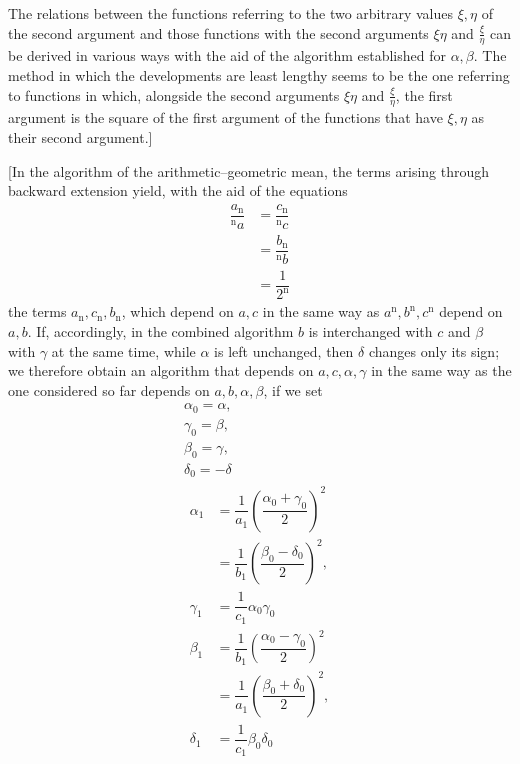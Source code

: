 The relations between the functions referring to the two arbitrary values $\xi,\allowbreak \eta$ of the second argument and those functions with the second arguments $\xi\eta$ and $\frac\xi\eta$ can be derived in various ways with
the aid of the algorithm established for $\alpha,\allowbreak \beta$. The method in which the developments are least lengthy seems to be the one referring to functions in which, alongside the second arguments $\xi\eta$ and $\frac{\xi}{\eta}$, the first argument is the square of the first argument of the functions that have $\xi,\allowbreak \eta$ as their second argument.]

[In the algorithm of the arithmetic–geometric mean, the terms arising through backward extension yield, with the aid of the equations
\[
\begin{aligned}\dfrac{a_{\mathrm n}}{{}^{\mathrm n}\!a}&=\dfrac{c_{\mathrm n}}{{}^{\mathrm n}\!c}\\[7pt]&=\dfrac{b_{\mathrm n}}{{}^{\mathrm n}\!b}\\[7pt]&=\dfrac{1}{2^{\mathrm n}}\end{aligned}
\]
the terms $a_{\mathrm n},\allowbreak c_{\mathrm n},\allowbreak b_{\mathrm n}$, which depend on $a,\allowbreak c$ in the same way as $a^{\mathrm n},\allowbreak b^{\mathrm n},\allowbreak c^{\mathrm n}$ depend on $a,\allowbreak b$. If, accordingly, in the combined algorithm $b$ is interchanged with $c$ and $\beta$ with $\gamma$ at the same time, while $\alpha$ is left unchanged, then $\delta$ changes only its sign; we therefore obtain an algorithm that depends on $a,\allowbreak c,\allowbreak \alpha,\allowbreak \gamma$ in the same way as the one considered so far depends on $a,\allowbreak b,\allowbreak \alpha,\allowbreak \beta$, if we set
\[
\begin{gathered}
\alpha_0=\alpha,\\[7pt]\gamma_0=\beta,\\[7pt]\beta_0=\gamma,\\[7pt]\delta_0=-\delta\\[8pt]
\begin{aligned}
\alpha_1&=\dfrac{1}{a_1}\left(\dfrac{\alpha_0+\gamma_0}{2}\right)^2
\\[6pt]&=\dfrac{1}{b_1}\left(\dfrac{\beta_0-\delta_0}{2}\right)^2,
\\[7pt]\gamma_1&=\dfrac{1}{c_1}\alpha_0\gamma_0\\[8pt]
\beta_1&=\dfrac{1}{b_1}\left(\dfrac{\alpha_0-\gamma_0}{2}\right)^2
\\[6pt]&=\dfrac{1}{a_1}\left(\dfrac{\beta_0+\delta_0}{2}\right)^2,
\\[7pt]\delta_1&=\dfrac{1}{c_1}\beta_0\delta_0
\end{aligned}
\end{gathered}
\]
